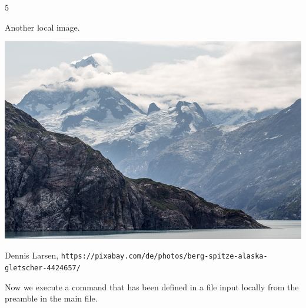 \documentclass[../../main.tex]{subfiles}
\begin{document}
5

Another local image.
\begin{center}
\includegraphics[width=\textwidth]{mountain-4424657_640.jpg}

Dennis Larsen, \texttt{https://pixabay.com/de/photos/berg-spitze-alaska-gletscher-4424657/}
\end{center}





Now we execute a command that has been defined in a file input locally
from the preamble in the main file.

\mycmd
\end{document}
